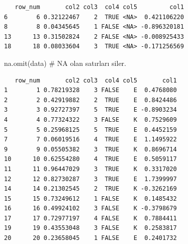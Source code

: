 \documentclass[
  letterpaper,
  DIV=11,
  numbers=noendperiod]{scrreprt}
\newenvironment{Shaded}{\begin{snugshade}}{\end{snugshade}}
\newcommand{\CommentTok}[1]{\textcolor[rgb]{0.37,0.37,0.37}{#1}}
\newcommand{\FunctionTok}[1]{\textcolor[rgb]{0.28,0.35,0.67}{#1}}
\newcommand{\NormalTok}[1]{\textcolor[rgb]{0.00,0.23,0.31}{#1}}
\begin{document}
\begin{verbatim}
   row_num       col2 col3  col4 col5         col1
6        6 0.32122467    2  TRUE <NA>  0.421106220
8        8 0.04345645    1 FALSE <NA> -0.896320181
13      13 0.31502824    2 FALSE <NA> -0.008925433
18      18 0.08033604    3  TRUE <NA> -0.171256569
\end{verbatim}

\begin{Shaded}
\begin{Highlighting}[]
\FunctionTok{na.omit}\NormalTok{(data) }\CommentTok{\# NA olan satırları siler.}
\end{Highlighting}
\end{Shaded}

\begin{verbatim}
   row_num       col2 col3  col4 col5       col1
1        1 0.78219328    3 FALSE    E  0.4768080
2        2 0.42919882    2  TRUE    E  0.8424486
3        3 0.92727397    5  TRUE    E -0.8903234
4        4 0.77324322    3 FALSE    K  0.7529609
5        5 0.25968125    5  TRUE    E  0.4452159
7        7 0.06019516    4  TRUE    E  1.1495922
9        9 0.05505382    3  TRUE    K  0.8696714
10      10 0.62554280    4  TRUE    E  0.5059117
11      11 0.96447029    3  TRUE    K  0.3317020
12      12 0.82730287    3  TRUE    E  1.7399997
14      14 0.21302545    2  TRUE    K -0.3262169
15      15 0.73249612    1 FALSE    K  0.1485432
16      16 0.49924102    3 FALSE    K -0.3798679
17      17 0.72977197    4 FALSE    K  0.7884411
19      19 0.43553048    3 FALSE    K  0.2583817
20      20 0.23658045    1 FALSE    E  0.2401732
\end{verbatim}
\end{document}
